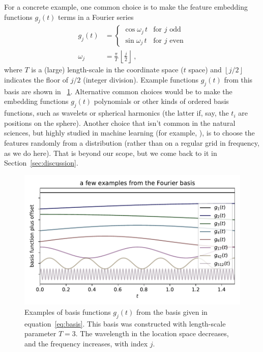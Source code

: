 \documentclass[12pt,letterpaper]{article}
\newlength{\figurewidth}
\newcommand{\floor}[1]{\left\lfloor #1 \right\rfloor}
\newcommand{\sectionname}{Section}
\begin{document}
For a concrete example, one common choice is to make the feature embedding functions $g_j(t)$ terms in a Fourier series
\begin{align}\label{eq:basis}
    g_j(t) &= \left\{\begin{array}{ll}
            \cos\omega_j\,t & \mbox{for $j$ odd} \\
            \sin\omega_j\,t & \mbox{for $j$ even}\end{array}\right.
    \\
    \omega_j &= \frac{\pi}{T}\,\floor{\frac{j}{2}}
    ~,
\end{align}
where $T$ is a (large) length-scale in the coordinate space ($t$ space) and $\floor{j/2}$ indicates the floor of $j/2$ (integer division).
Example functions $g_j(t)$ from this basis are shown in \figurename~\ref{fig:basis}.
Alternative common choices would be to make the embedding functions $g_j(t)$ polynomials or other kinds of ordered basis functions, such as wavelets or spherical harmonics (the latter if, say, the $t_i$ are positions on the sphere).
Another choice that isn't common in the natural sciences, but highly studied in machine learning (for example, \citealt{rahimi2007random}), is to choose the features randomly from a distribution (rather than on a regular grid in frequency, as we do here). That is beyond our scope, but we come back to it in \sectionname~\ref{sec:discussion}.
\begin{figure}[t]
    \begin{mdframed}
    \includegraphics[width=\figurewidth]{paper/fourier.pdf}
    \caption{Examples of basis functions $g_j(t)$ from the basis given in equation~\eqref{eq:basis}. This basis was constructed with length-scale parameter $T=3$. The wavelength in the location space decreases, and the frequency increases, with index $j$.}
    \label{fig:basis}
    \end{mdframed}
\end{figure}
\end{document}
